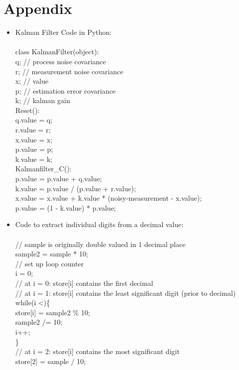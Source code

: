 \documentclass{article}
\begin{document}
\section{Appendix}
\begin{itemize}
\item Kalman Filter Code in Python:\\
\\class KalmanFilter(object):\\
    \tabto{0.6cm}q;      // process noise covariance\\
    \tabto{0.6cm}r;      // measurement noise covariance\\
    \tabto{0.6cm}x;      // value\\
    \tabto{0.6cm}p;      // estimation error covariance\\
    \tabto{0.6cm}k;      // kalman gain\\

Reset():\\
    \tabto{0.6cm}q.value = q;\\
    \tabto{0.6cm}r.value = r;\\
    \tabto{0.6cm}x.value = x;\\
    \tabto{0.6cm}p.value = p;\\
    \tabto{0.6cm}k.value = k;\\
    
Kalmanfilter\_C():\\
    \tabto{0.6cm}p.value = p.value + q.value;\\
    \tabto{0.6cm}k.value = p.value / (p.value + r.value);\\
    \tabto{0.6cm}x.value = x.value + k.value * (noisy-measurement - x.value);\\
    \tabto{0.6cm}p.value = (1 - k.value) * p.value;\\

\item Code to extract individual digits from a decimal value:\\
\\ // sample is originally double valued in 1 decimal place\\
sample2 = sample * 10;\\
        
// set up loop counter\\
i = 0;\\                          

// at i = 0: store[i] contains the first decimal\\
// at i = 1: store[i] contains the least significant digit (prior to decimal)\\
while(i \textless {})\{\\                   
    \tabto{0.6cm}store[i] = sample2 \% 10;\\   
    \tabto{0.6cm}sample2 /= 10;\\              
    \tabto{0.6cm}i++;\\
\}\\

// at i = 2: store[i] contains the most significant digit\\
store[2] = sample / 10;\\ 

\end{itemize}
\end{document}
